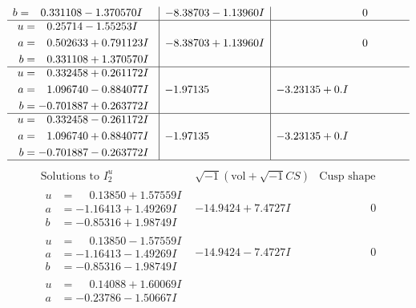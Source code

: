 \documentclass[1p]{elsarticle_modified}
\theoremstyle{definition}
\newcommand{\I}{\sqrt{-1}}
\begin{document}
$$\begin{array}{c|c|c}
\begin{aligned}
b &= \phantom{-}0.331108 - 1.370570 I\end{aligned}
 & -8.38703 - 1.13960 I & \phantom{-0.000000 } 0 \\ \hline\begin{aligned}
u &= \phantom{-}0.25714 - 1.55253 I \\
a &= \phantom{-}0.502633 + 0.791123 I \\
b &= \phantom{-}0.331108 + 1.370570 I\end{aligned}
 & -8.38703 + 1.13960 I & \phantom{-0.000000 } 0 \\ \hline\begin{aligned}
u &= \phantom{-}0.332458 + 0.261172 I \\
a &= \phantom{-}1.096740 - 0.884077 I \\
b &= -0.701887 + 0.263772 I\end{aligned}
 & -1.97135\phantom{ +0.000000I} & -3.23135 + 0. I\phantom{ +0.000000I} \\ \hline\begin{aligned}
u &= \phantom{-}0.332458 - 0.261172 I \\
a &= \phantom{-}1.096740 + 0.884077 I \\
b &= -0.701887 - 0.263772 I\end{aligned}
 & -1.97135\phantom{ +0.000000I} & -3.23135 + 0. I\phantom{ +0.000000I}\\
 \hline 
 \end{array}$$\newpage$$\begin{array}{c|c|c}  
\text{Solutions to }I^u_{2}& \I (\text{vol} + \sqrt{-1}CS) & \text{Cusp shape}\\
 \hline 
\begin{aligned}
u &= \phantom{-}0.13850 + 1.57559 I \\
a &= -1.16413 + 1.49269 I \\
b &= -0.85316 + 1.98749 I\end{aligned}
 & -14.9424 + 7.4727 I & \phantom{-0.000000 } 0 \\ \hline\begin{aligned}
u &= \phantom{-}0.13850 - 1.57559 I \\
a &= -1.16413 - 1.49269 I \\
b &= -0.85316 - 1.98749 I\end{aligned}
 & -14.9424 - 7.4727 I & \phantom{-0.000000 } 0 \\ \hline\begin{aligned}
u &= \phantom{-}0.14088 + 1.60069 I \\
a &= -0.23786 - 1.50667 I \\

\end{aligned}
\end{array}$$
\end{document}
